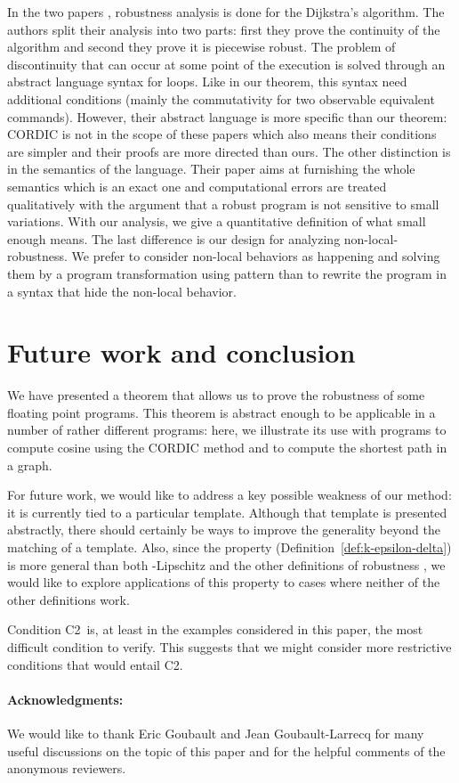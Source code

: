 \documentclass[copyright,creativecommons]{eptcs}
\newcommand{\Ctwo}{C2}
\begin{document}
In the two papers \cite{chaudhuri11sigsoft,chaudhuri10popl},
robustness analysis is done for the Dijkstra's algorithm. The authors
split their analysis into two parts: first they prove the continuity
of the algorithm and second they prove it is piecewise robust. The
problem of discontinuity that can occur at some point of the execution
is solved through an abstract language syntax for loops.  Like in our
theorem, this syntax need additional conditions (mainly the
commutativity for two observable equivalent commands).  However, their
abstract language is more specific than our theorem: CORDIC is not in
the scope of these papers which also means their conditions are
simpler and their proofs are more directed than ours.  The other
distinction is in the semantics of the language. Their paper aims at
furnishing the whole semantics which is an exact one and computational
errors are treated qualitatively with the argument that a robust
program is not sensitive to small variations. With our analysis, we
give a quantitative definition of what small enough means.  The last
difference is our design for analyzing non-local-robustness.  We prefer
to consider non-local behaviors as happening and solving them by a program
transformation using pattern than to rewrite the program in a syntax
that hide the non-local behavior.


\section{Future work and conclusion}\label{sec:conclude}


We have presented a theorem that allows us to prove the robustness of some
floating point programs.  This theorem is abstract enough to be
applicable in a number of rather different programs: here, we
illustrate its use with programs to compute cosine using the CORDIC
method and to compute the shortest path in a graph. 





For future work, we would like to address a key possible weakness of
our method: it is currently tied to a particular template.  Although
that template is presented abstractly, there should certainly be ways
to improve the generality beyond the matching of a template.  Also,
since the property 
(Definition~\ref{def:k-epsilon-delta}) is more general than both
-Lipschitz and the other definitions of robustness
\cite{majumdar09rtss,majumdar10memocode}, we would like to explore
applications of this property to cases where neither of the other
definitions work.

Condition \Ctwo\ is, at least in the examples considered in this paper,
the most difficult condition to verify.  This suggests that we might
consider more restrictive conditions that would entail \Ctwo.

\paragraph{Acknowledgments:}  We would like to thank Eric Goubault and
Jean Goubault-Larrecq for many useful discussions on the topic of this
paper and for the helpful comments of the anonymous reviewers. 



\end{document}
